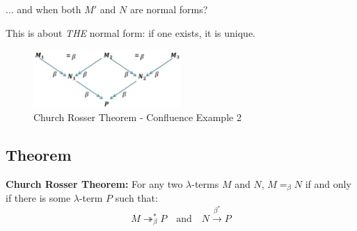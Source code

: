 \documentclass{article}
\begin{document}
    ... and when both $M'$ and $N$ are normal forms?
    
This is about \emph{THE} normal form: if one exists, it is unique.

\begin{figure}[ht]
    \centering
    \includegraphics[width=0.5\textwidth]{img/CR_theorem_diagram_1.jpg} %
    \caption{Church Rosser Theorem - Confluence Example 2}
    \label{fig:cr-diagram-2}
\end{figure}

\subsection*{Theorem}
\textbf{Church Rosser Theorem:} For any two $\lambda$-terms $M$ and $N$, $M =_\beta N$ if and only if there is some $\lambda$-term $P$ such that:
\[
M \twoheadrightarrow_\beta^* P \quad \text{and} \quad N \xrightarrow{\beta^*} P
\]
\end{document}
